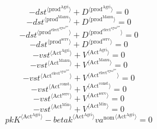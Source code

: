 \begin{equation}
-{{d\!s\!t}}^{\langle \mathrm{\mathrm{prod}^{\mathrm{Agri}}}\rangle} + {D}^{\langle \mathrm{prod}^{\mathrm{Agri}}\rangle} = 0
\end{equation}
\begin{equation}
-{{d\!s\!t}}^{\langle \mathrm{\mathrm{prod}^{\mathrm{Manu}}}\rangle} + {D}^{\langle \mathrm{prod}^{\mathrm{Manu}}\rangle} = 0
\end{equation}
\begin{equation}
-{{d\!s\!t}}^{\langle \mathrm{\mathrm{prod}^{\mathrm{elect}^{\mathrm{agua}^{\mathrm{gas}}}}}\rangle} + {D}^{\langle \mathrm{prod}^{\mathrm{elect}^{\mathrm{agua}^{\mathrm{gas}}}}\rangle} = 0
\end{equation}
\begin{equation}
-{{d\!s\!t}}^{\langle \mathrm{\mathrm{prod}^{\mathrm{serv}}}\rangle} + {D}^{\langle \mathrm{prod}^{\mathrm{serv}}\rangle} = 0
\end{equation}
\begin{equation}
-{{v\!s\!t}}^{\langle \mathrm{\mathrm{Act}^{\mathrm{Agri}}}\rangle} + {V}^{\langle \mathrm{Act}^{\mathrm{Agri}}\rangle} = 0
\end{equation}
\begin{equation}
-{{v\!s\!t}}^{\langle \mathrm{\mathrm{Act}^{\mathrm{Manu}}}\rangle} + {V}^{\langle \mathrm{Act}^{\mathrm{Manu}}\rangle} = 0
\end{equation}
\begin{equation}
-{{v\!s\!t}}^{\langle \mathrm{\mathrm{Act}^{\mathrm{elect}^{\mathrm{agua}^{\mathrm{gas}}}}}\rangle} + {V}^{\langle \mathrm{Act}^{\mathrm{elect}^{\mathrm{agua}^{\mathrm{gas}}}}\rangle} = 0
\end{equation}
\begin{equation}
-{{v\!s\!t}}^{\langle \mathrm{\mathrm{Act}^{\mathrm{const}}}\rangle} + {V}^{\langle \mathrm{Act}^{\mathrm{const}}\rangle} = 0
\end{equation}
\begin{equation}
-{{v\!s\!t}}^{\langle \mathrm{\mathrm{Act}^{\mathrm{serv}}}\rangle} + {V}^{\langle \mathrm{Act}^{\mathrm{serv}}\rangle} = 0
\end{equation}
\begin{equation}
-{{v\!s\!t}}^{\langle \mathrm{\mathrm{Act}^{\mathrm{Min}}}\rangle} + {V}^{\langle \mathrm{Act}^{\mathrm{Min}}\rangle} = 0
\end{equation}
\begin{equation}
{{p\!k}} {{K}^{\langle \mathrm{Act}^{\mathrm{Agri}}\rangle}} - {{{b\!e\!t\!a\!k}}^{\langle \mathrm{\mathrm{Act}^{\mathrm{Agri}}}\rangle}} {{{v\!a}^{\mathrm{nom}}}^{\langle \mathrm{Act}^{\mathrm{Agri}}\rangle}} = 0
\end{equation}
